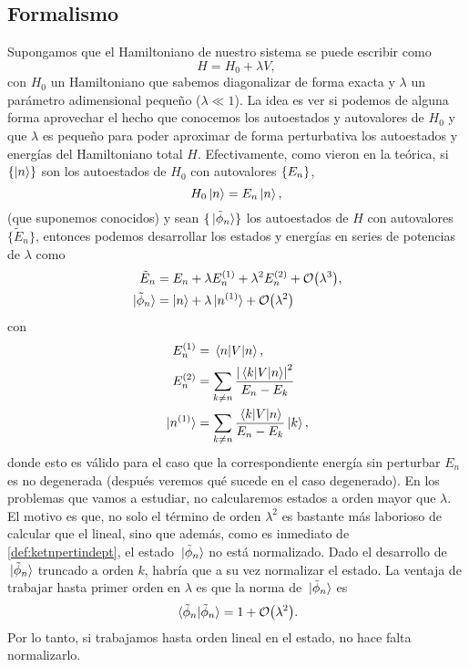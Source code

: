 \documentclass[10pt, a4paper]{article}
\numberwithin{equation}{subsection}
\begin{document}
\subsection{Formalismo}
Supongamos que el Hamiltoniano de nuestro sistema se puede escribir como
\begin{equation}
  H = H_0 + \lambda V,
\end{equation}
con $H_0$ un Hamiltoniano que sabemos diagonalizar de forma exacta y $\lambda$
un parámetro adimensional pequeño ($\lambda \ll 1$). La idea es ver si podemos
de alguna forma aprovechar el hecho que conocemos los autoestados y autovalores
de $H_0$ y que $\lambda$ es pequeño para poder aproximar de forma perturbativa
los autoestados y energías del Hamiltoniano total $H$. Efectivamente, como
vieron en la teórica, si $\set{\ket{n}}$ son los autoestados de $H_0$ con
autovalores $\set{E_n}$,
\begin{equation}
  H_0\ket{n} = E_n\ket{n},
\end{equation}
(que suponemos conocidos) y sean $\{\ket*{\tilde{\phi}_n}\}$ los autoestados de
$H$ con autovalores $\{\tilde{E}_n\}$, entonces podemos desarrollar los estados
y energías en series de potencias de $\lambda$ como
\begin{align}
  \tilde{E}_n &= E_n + \lambda E_n^{(1)} + \lambda^2 E_n^{(2)} +
    \order{\lambda^3}, \label{def:enpertindept} \\
  \ket*{\tilde{\phi}_n} &= \ket{n} + \lambda\ket*{n^{(1)}} +
    \order{\lambda^2} \label{def:ketnpertindept}
\end{align}
con
\begin{align}
  E_n^{(1)} &= \matrixel{n}{V}{n}, \label{def:enord1indept} \\
  E_n^{(2)} &= \sum_{k \neq n}\frac{\abs{\matrixel{k}{V}{n}}^2}{E_n - E_k}
    \label{def:enord2indept} \\
  \ket*{n^{(1)}} &= \sum_{k \neq n}\frac{\matrixel{k}{V}{n}}{E_n - E_k}\ket{k},
    \label{def:ketnord1indept}
\end{align}
donde esto es válido para el caso que la correspondiente energía sin perturbar
$E_n$ es no degenerada (después veremos qué sucede en el caso degenerado).
En los problemas que vamos a estudiar, no calcularemos estados a orden mayor
que $\lambda$. El motivo es que, no solo el término de orden $\lambda^2$ es
bastante más laborioso de calcular que el lineal, sino que además, como es
inmediato de \eqref{def:ketnpertindept}, el estado $\ket*{\tilde{\phi}_n}$ no
está normalizado. Dado el desarrollo de $\ket*{\tilde{\phi}_n}$ truncado a
orden $k$, habría que a su vez normalizar el estado. La ventaja de trabajar
hasta primer orden en $\lambda$ es que la norma de $\ket*{\tilde{\phi}_n}$ es
\begin{equation}
  \braket*{\tilde{\phi}_n}{\tilde{\phi}_n} = 1 + \order{\lambda^2}.
\end{equation}
Por lo tanto, si trabajamos hasta orden lineal en el estado, no hace falta
normalizarlo.
\end{document}

